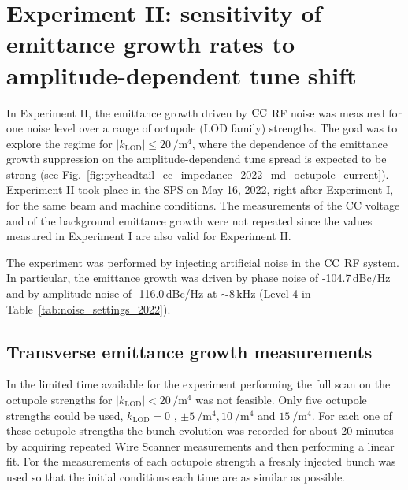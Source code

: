 \section{Experiment II: sensitivity of emittance growth rates to amplitude-dependent tune shift}\label{subsec:cc_md_2022_octupole_scan}

In Experiment II, the emittance growth driven by ${\mathrm{CC}}$ RF noise was measured for one noise level over a range of octupole (LOD family) strengths. The goal was to explore the regime for $|k_\mathrm{LOD} |\leq 20$\,$\mathrm{/m^4}$, where the dependence of the emittance growth suppression on the amplitude-dependend tune spread is expected to be strong (see Fig.~\ref{fig:pyheadtail_cc_impedance_2022_md_octupole_current}). Experiment II took place in the SPS on May 16, 2022, right after Experiment I, for the same beam and machine conditions. The measurements of the CC voltage and of the background emittance growth were not repeated since the values measured in Experiment I are also valid for Experiment II.

The experiment was performed by injecting artificial noise in the ${\mathrm{CC}}$ RF system. In particular, the emittance growth was driven by phase noise of -104.7\,dBc/Hz and by amplitude noise of -116.0\,dBc/Hz at $\sim$8\,kHz (Level 4 in Table~\ref{tab:noise_settings_2022}). 



\subsection{Transverse emittance growth measurements}\label{subsec:emit_growth_exp2}

In the limited time available for the experiment performing the full scan on the octupole strengths for $|k_\mathrm{LOD}| < 20$\,$\mathrm{/m^4}$ was not feasible. Only five octupole strengths could be used, $k_\mathrm{LOD} = 0$%
, $\pm 5 \ \mathrm{/m^4}, 10 \ \mathrm{/m^4}$ and $15 \ \mathrm{/m^4}$. %
For each one of these octupole strengths the bunch evolution was recorded for about 20 minutes by acquiring repeated Wire Scanner measurements and then performing a linear fit. For the measurements of each octupole strength a freshly injected bunch was used so that the initial conditions each time are as similar as possible.


